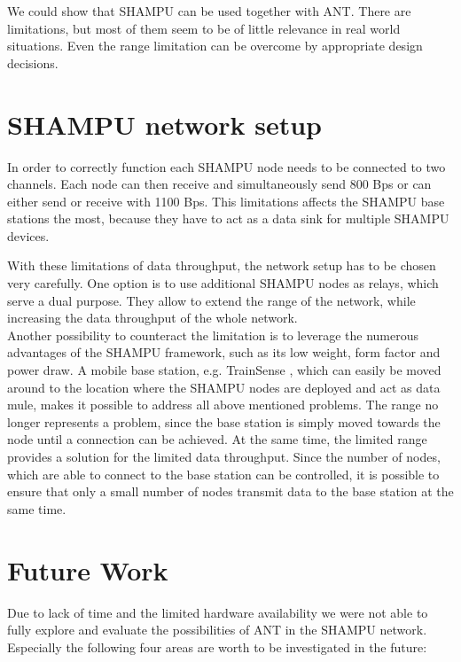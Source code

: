 We could show that SHAMPU can be used together with ANT. There are limitations, but most of them seem to be of little relevance in real world situations. Even the range limitation can be overcome by appropriate design decisions.

\section{SHAMPU network setup}
In order to correctly function each SHAMPU node needs to be connected to two channels. Each node can then receive and simultaneously send 800 Bps or can either send or receive with 1100 Bps. This limitations affects the SHAMPU base stations the most, because they have to act as a data sink for multiple SHAMPU devices.

With these limitations of data throughput, the network setup has to be chosen very carefully. One option is to use additional SHAMPU nodes as relays, which serve a dual purpose. They allow to extend the range of the network, while increasing the data throughput of the whole network.\\ Another possibility to counteract the limitation is to leverage the numerous advantages of the SHAMPU framework, such as its low weight, form factor and power draw. A mobile base station, e.g. TrainSense \cite{smeets2013trainsense}, which can easily be moved around to the location where the SHAMPU nodes are deployed and act as data mule, makes it possible to address all above mentioned problems. The range no longer represents a problem, since the base station is simply moved towards the node until a connection can be achieved. At the same time, the limited range provides a solution for the limited data throughput. Since the number of nodes, which are able to connect to the base station can be controlled, it is possible to ensure that only a small number of nodes transmit data to the base station at the same time.


\newpage
\section{Future Work}
\label{sec:future}
Due to lack of time and the limited hardware availability we were not able to fully explore and evaluate the possibilities of ANT in the SHAMPU network. Especially the following four areas are worth to be investigated in the future:

